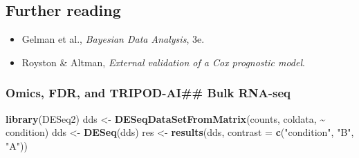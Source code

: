 \documentclass[
]{article}
\newenvironment{Shaded}{\begin{snugshade}}{\end{snugshade}}
\newcommand{\AttributeTok}[1]{\textcolor[rgb]{0.13,0.29,0.53}{#1}}
\newcommand{\DecValTok}[1]{\textcolor[rgb]{0.00,0.00,0.81}{#1}}
\newcommand{\FunctionTok}[1]{\textcolor[rgb]{0.13,0.29,0.53}{\textbf{#1}}}
\newcommand{\NormalTok}[1]{#1}
\newcommand{\OtherTok}[1]{\textcolor[rgb]{0.56,0.35,0.01}{#1}}
\newcommand{\SpecialCharTok}[1]{\textcolor[rgb]{0.81,0.36,0.00}{\textbf{#1}}}
\newcommand{\StringTok}[1]{\textcolor[rgb]{0.31,0.60,0.02}{#1}}
\providecommand{\tightlist}{%
  \setlength{\itemsep}{0pt}\setlength{\parskip}{0pt}}
\begin{document}
\subsection{Further reading}\label{further-reading-14}

\begin{itemize}
\tightlist
\item
  Gelman et al., \emph{Bayesian Data Analysis}, 3e.
\item
  Royston \& Altman, \emph{External validation of a Cox prognostic
  model}.
\end{itemize}

\subsubsection{Omics, FDR, and TRIPOD-AI\#\# Bulk
RNA-seq}\label{omics-fdr-and-tripod-ai-bulk-rna-seq}

\begin{Shaded}
\begin{Highlighting}[]
\FunctionTok{library}\NormalTok{(DESeq2)}
\NormalTok{dds }\OtherTok{\textless{}{-}} \FunctionTok{DESeqDataSetFromMatrix}\NormalTok{(counts, coldata, }\SpecialCharTok{\textasciitilde{}}\NormalTok{ condition)}
\NormalTok{dds }\OtherTok{\textless{}{-}} \FunctionTok{DESeq}\NormalTok{(dds)}
\NormalTok{res }\OtherTok{\textless{}{-}} \FunctionTok{results}\NormalTok{(dds, }\AttributeTok{contrast =} \FunctionTok{c}\NormalTok{(}\StringTok{"condition"}\NormalTok{, }\StringTok{"B"}\NormalTok{, }\StringTok{"A"}\NormalTok{))}
\end{Highlighting}
\end{Shaded}

\begin{Shaded}
\end{Shaded}
\end{document}

